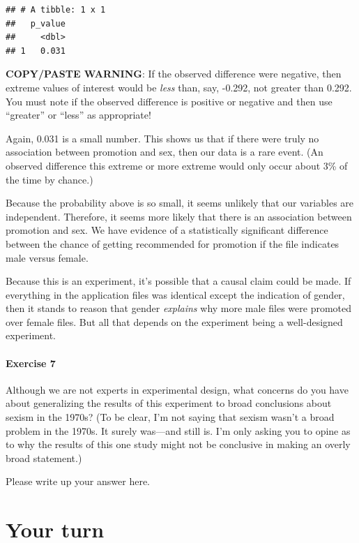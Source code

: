 \documentclass[
]{book}
\begin{document}
\begin{verbatim}
## # A tibble: 1 x 1
##   p_value
##     <dbl>
## 1   0.031
\end{verbatim}

\textbf{COPY/PASTE WARNING}: If the observed difference were negative, then extreme values of interest would be \emph{less} than, say, -0.292, not greater than 0.292. You must note if the observed difference is positive or negative and then use ``greater'' or ``less'' as appropriate!

Again, 0.031 is a small number. This shows us that if there were truly no association between promotion and sex, then our data is a rare event. (An observed difference this extreme or more extreme would only occur about 3\% of the time by chance.)

Because the probability above is so small, it seems unlikely that our variables are independent. Therefore, it seems more likely that there is an association between promotion and sex. We have evidence of a statistically significant difference between the chance of getting recommended for promotion if the file indicates male versus female.

Because this is an experiment, it's possible that a causal claim could be made. If everything in the application files was identical except the indication of gender, then it stands to reason that gender \emph{explains} why more male files were promoted over female files. But all that depends on the experiment being a well-designed experiment.

\hypertarget{exercise-7-3}{%
\paragraph*{Exercise 7}\label{exercise-7-3}}

Although we are not experts in experimental design, what concerns do you have about generalizing the results of this experiment to broad conclusions about sexism in the 1970s?
(To be clear, I'm not saying that sexism wasn't a broad problem in the 1970s. It surely was---and still is. I'm only asking you to opine as to why the results of this one study might not be conclusive in making an overly broad statement.)

Please write up your answer here.

\hypertarget{randomization2-your-turn}{%
\section{Your turn}\label{randomization2-your-turn}}
\end{document}
